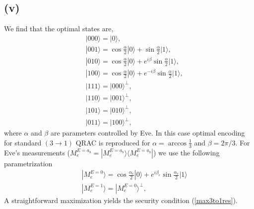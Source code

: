 \subsection*{(v)}
We find that the optimal states are,
\begin{eqnarray}
&& |000\rangle=|0\rangle,\nonumber\\
&& |001\rangle=\cos \frac{\alpha}{2}|0\rangle+\sin\frac{\alpha}{2}|1\rangle,\nonumber\\
&& |010\rangle=\cos \frac{\alpha}{2}|0\rangle+e^{i\beta}\sin\frac{\alpha}{2}|1\rangle,\nonumber\\
&& |100\rangle=\cos \frac{\alpha}{2}|0\rangle+e^{-i\beta}\sin\frac{\alpha}{2}|1\rangle,\nonumber\\
&& |111\rangle=|000\rangle^\perp ,\nonumber \\
&& |110\rangle=|001\rangle^\perp ,\nonumber \\
&& |101\rangle=|010\rangle^\perp ,\nonumber \\
&& |011\rangle=|100\rangle^\perp,\label{a11}
\end{eqnarray}
where $\alpha$ and $\beta$ are parameters controlled by Eve.  In this case optimal encoding for standard $(3\to1)$ QRAC is reproduced for $\alpha=\arccos\frac{1}{3}$ and $\beta=2\pi/3$.
For Eve's measurements ($ M_e^{E=a_b}=|M_e^{E=a_b}\rangle\langle M_e^{E=a_b}|$) we use the following parametrization
\begin{eqnarray}
&& |M_e^{E=0}\rangle = \cos\frac{\alpha_e}{2}|0\rangle+e^{i\beta_e}\sin\frac{\alpha_e}{2}|1\rangle \nonumber \\
&& |M_e^{E=1}\rangle = |M_e^{E=0}\rangle^\perp \label{a2},
\end{eqnarray} 
A straightforward maximization yields the security condition (\ref{max3to1res}).